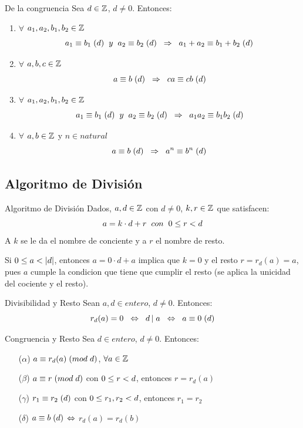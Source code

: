 \documentclass[10pt]{article}
\begin{document}
\begin{prop}{De la congruencia}
Sea $d \in \entero{}$, $d \neq 0$. Entonces:
\begin{enumerate}
 \item $\forall$ $a_1,a_2,b_1,b_2 \in \entero{}$
 \[\congruente{a_1}{b_1}{d} \es{0.2} y \es{0.2} \congruente{a_2}{b_2}{d} \es{0.2} \implica \es{0.2} 
 \congruente{a_1 +a_2}{b_1+b_2}{d}\]
 \item $\forall$ $a, b, c \in \entero{}$
 \[\congruente{a}{b}{d} \es{0.2} \implica \es{0.2} \congruente{c a}{c b}{d}\]
 \item $\forall$ $a_1,a_2,b_1,b_2 \in \entero{}$
 \[\congruente{a_1}{b_1}{d} \es{0.2} y \es{0.2} \congruente{a_2}{b_2}{d} \es{0.2} \implica \es{0.2} 
 \congruente{a_1 a_2}{b_1 b_2}{d}\]
 \item $\forall$ $a, b\in \entero{}$ y $n \in natural{}$
 \[\congruente{a}{b}{d} \es{0.2} \implica \es{0.2} \congruente{a^n}{b^n}{d}\]
\end{enumerate}
\end{prop}

\begin{center}
    \subsection{Algoritmo de División} 
\end{center}


\begin{teo}{Algoritmo de División}
Dados, $a,d \in \entero{}$ con $d \neq 0$,  $k,r \in \entero{}$ que satisfacen:
\[a = k \cdot d + r \es{0.2} con \es{0.2} 0 \menig r < d \]
A $k$ se le da el nombre de conciente y a $r$ el nombre de resto.
\end{teo}

\begin{obs}{}
 Si $ 0 \menig a < |d| $, entonces $a = 0 \cdot d + a$ implica que $k = 0$ y el resto $r = r_d(a)=a$, pues $a$ cumple la condicion que tiene que cumplir el resto (se aplica la unicidad del cociente y el resto).
\end{obs}

\begin{obs}{Divisibilidad y Resto}
Sean $a, d \in entero{}$, $d \neq 0$. Entonces:
\[r_d(a)= 0  \es{0.2} \sii \es{0.2} \divi{d}{a} \es{0.2} \sii \es{0.2} \congruente{a}{0}{d}\]
\end{obs}

\begin{prop}{Congruencia y Resto}
Sea $d \in entero{}$, $d \neq 0$. Entonces:
\begin{itemize}
 \item[($\alpha$)] $\congruente{a}{r_d(a)}{mod \es{0.1} d}$, $\forall a \in \entero{}$ 
 \item[ ($\beta$)] $\congruente{a}{r}{mod \es{0.1} d}$ con $0 \menig r < d$, entonces $r = r_d(a)$
 \item[($\gamma$)] $\congruente{r_1}{r_2}{d}$ con $0 \menig r_1, r_2 < d$, entonces $r_1 = r_2$
 \item[($\delta$)] $\congruente{a}{b}{d}$ $\sii$ $r_d(a) = r_d(b)$
\end{itemize}
\end{prop}
\end{document}
